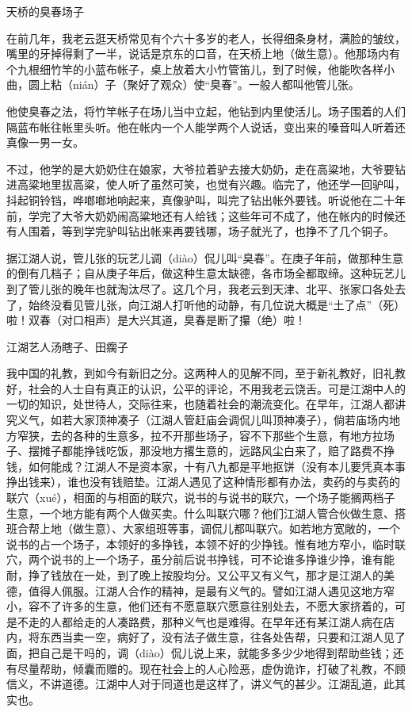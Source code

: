 \documentclass[12pt,UTF8]{ctexbook}
\begin{document}
天桥的臭春场子


在前几年，我老云逛天桥常见有个六十多岁的老人，长得细条身材，满脸的皱纹，嘴里的牙掉得剩了一半，说话是京东的口音，在天桥上地（做生意）。他那场内有个九根细竹竿的小蓝布帐子，桌上放着大小竹管笛儿，到了时候，他能吹各样小曲，圆上粘（nián）子（聚好了观众）使“臭春”。一般人都叫他管儿张。

他使臭春之法，将竹竿帐子在场儿当中立起，他钻到内里使活儿。场子围着的人们隔蓝布帐往帐里头听。他在帐内一个人能学两个人说话，变出来的嗓音叫人听着还真像一男一女。

不过，他学的是大奶奶住在娘家，大爷拉着驴去接大奶奶，走在高粱地，大爷要钻进高粱地里拔高粱，使人听了虽然可笑，也觉有兴趣。临完了，他还学一回驴叫，抖起铜铃铛，哗啷啷地响起来，真像驴叫，叫完了钻出帐外要钱。听说他在二十年前，学完了大爷大奶奶闹高粱地还有人给钱；这些年可不成了，他在帐内的时候还有人围着，等到学完驴叫钻出帐来再要钱哪，场子就光了，也挣不了几个铜子。

据江湖人说，管儿张的玩艺儿调（diào）侃儿叫“臭春”。在庚子年前，做那种生意的倒有几档子；自从庚子年后，做这种生意太缺德，各市场全都取缔。这种玩艺儿到了管儿张的晚年也就淘汰尽了。这几个月，我老云到天津、北平、张家口各处去了，始终没看见管儿张，向江湖人打听他的动静，有几位说大概是“土了点”（死）啦！双春（对口相声）是大兴其道，臭春是断了攥（绝）啦！





江湖艺人汤瞎子、田瘸子


我中国的礼教，到如今有新旧之分。这两种人的见解不同，至于新礼教好，旧礼教好，社会的人士自有真正的认识，公平的评论，不用我老云饶舌。可是江湖中人的一切的知识，处世待人，交际往来，也随着社会的潮流变化。在早年，江湖人都讲究义气，如若大家顶神凑子（江湖人管赶庙会调侃儿叫顶神凑子），倘若庙场内地方窄狭，去的各种的生意多，拉不开那些场子，容不下那些个生意，有地方拉场子、摆摊子都能挣钱吃饭，那没地方撂生意的，远路风尘白来了，赔了路费不挣钱，如何能成？江湖人不是资本家，十有八九都是平地抠饼（没有本儿要凭真本事挣出钱来），谁也没有钱赔垫。江湖人遇见了这种情形都有办法，卖药的与卖药的联穴（xué），相面的与相面的联穴，说书的与说书的联穴，一个场子能搁两档子生意，一个地方能有两个人做买卖。什么叫联穴哪？他们江湖人管合伙做生意、搭班合帮上地（做生意）、大家组班等事，调侃儿都叫联穴。如若地方宽敞的，一个说书的占一个场子，本领好的多挣钱，本领不好的少挣钱。惟有地方窄小，临时联穴，两个说书的上一个场子，虽分前后说书挣钱，可不论谁多挣谁少挣，谁有能耐，挣了钱放在一处，到了晚上按股均分。又公平又有义气，那才是江湖人的美德，值得人佩服。江湖人合作的精神，是最有义气的。譬如江湖人遇见这地方窄小，容不了许多的生意，他们还有不愿意联穴愿意往别处去，不愿大家挤着的，可是不走的人都给走的人凑路费，那种义气也是难得。在早年还有某江湖人病在店内，将东西当卖一空，病好了，没有法子做生意，往各处告帮，只要和江湖人见了面，把自己是干吗的，调（diào）侃儿说上来，就能多多少少地得到帮助些钱；还有尽量帮助，倾囊而赠的。现在社会上的人心险恶，虚伪诡诈，打破了礼教，不顾信义，不讲道德。江湖中人对于同道也是这样了，讲义气的甚少。江湖乱道，此其实也。
\end{document}
